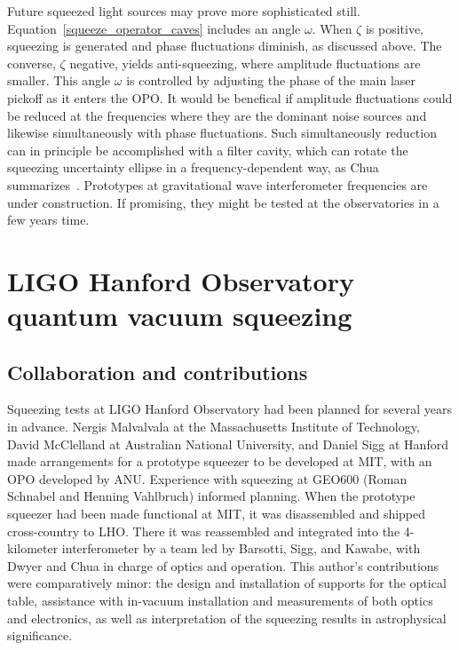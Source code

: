 Future squeezed light sources may prove more sophisticated still.
Equation~\ref{squeeze_operator_caves} includes an angle $\omega$. When $\zeta$ is positive, squeezing is generated and phase fluctuations diminish, as discussed above. 
The converse, $\zeta$ negative, yields anti-squeezing, where amplitude fluctuations are smaller. 
This angle $\omega$ is controlled by adjusting the phase of the main laser pickoff as it enters the OPO.
It would be benefical if amplitude fluctuations could be reduced at the frequencies where they are the dominant noise sources and likewise simultaneously with phase fluctuations. 
Such simultaneously reduction can in principle be accomplished with a filter cavity, which can rotate the squeezing uncertainty ellipse in a frequency-dependent way, as Chua summarizes~\cite{ChuaThesis}.
Prototypes at gravitational wave interferometer frequencies are under construction.
If promising, they might be tested at the observatories in a few years time.

    \section{LIGO Hanford Observatory quantum vacuum squeezing}
    \label{LHO_squeeze}


        \subsection{Collaboration and contributions}
        \label{contributions}

        Squeezing tests at LIGO Hanford Observatory had been planned for several years in advance.
Nergis Malvalvala at the Massachusetts Institute of Technology, David McClelland at Australian National University, and Daniel Sigg at Hanford made arrangements for a prototype squeezer to be developed at MIT, with an OPO developed by ANU.
Experience with squeezing at GEO600 (Roman Schnabel and Henning Vahlbruch) informed planning. 
When the prototype squeezer had been made functional at MIT, it was disassembled and shipped cross-country to LHO.
There it was reassembled and integrated into the 4-kilometer interferometer by a team led by Barsotti, Sigg, and Kawabe, with Dwyer and Chua in charge of optics and operation.
This author's contributions were comparatively minor: the design and installation of supports for the optical table, assistance with in-vacuum installation and measurements of both optics and electronics, as well as interpretation of the squeezing results in astrophysical significance.

